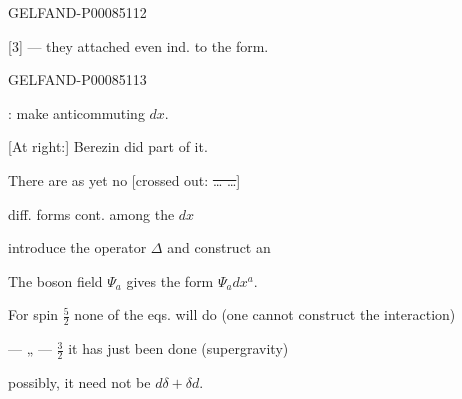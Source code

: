 \begin{GelfandAdjacentEvidence}{GELFAND-P000851}{12}


[3] — they attached even ind. to the form.
\end{GelfandAdjacentEvidence}
\begin{GelfandAdjacentEvidence}{GELFAND-P000851}{13}


: make anticommuting \(dx\).

[At right:] Berezin did part of it.

There are as yet no [crossed out: \sout{… …}]
\end{GelfandAdjacentEvidence}

diff. forms cont. among the \(dx\) 

introduce the operator \(\Delta\) and construct an 

The boson field \(\Psi_a\) gives the form \(\Psi_a dx^a\).

For spin \(\frac52\) none of the eqs. will do (one cannot construct the interaction)

— „ — \(\frac32\) it has just been done (supergravity)

 possibly, it need not be \(d\delta+\delta d\).


